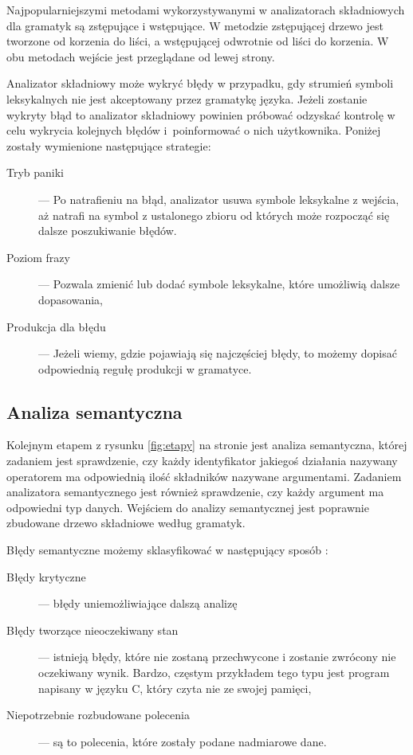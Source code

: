 Najpopularniejszymi metodami wykorzystywanymi w analizatorach składniowych
 dla gramatyk są zstępujące i wstępujące.
W metodzie zstępującej drzewo jest tworzone od korzenia do liści,
 a wstępującej odwrotnie od liści do korzenia.
W obu metodach wejście jest przeglądane od lewej strony.

Analizator składniowy może wykryć błędy w przypadku,
 gdy strumień symboli leksykalnych nie jest akceptowany przez gramatykę języka.
Jeżeli zostanie wykryty błąd to analizator składniowy powinien próbować odzyskać kontrolę w celu wykrycia kolejnych błędów
 i~poinformować o nich użytkownika.
Poniżej zostały  wymienione następujące strategie\cite{aho}:
\begin{description}
  \item[Tryb paniki] --- 
     Po natrafieniu na błąd,
      analizator usuwa symbole leksykalne z wejścia, 
      aż natrafi na symbol z ustalonego zbioru od których może rozpocząć się dalsze poszukiwanie błędów.
  \item[Poziom frazy] --- 
     Pozwala zmienić lub dodać symbole leksykalne,
      które umożliwią dalsze dopasowania,
  \item [Produkcja dla błędu] --- 
     Jeżeli wiemy, 
      gdzie pojawiają się najczęściej błędy,
      to możemy dopisać odpowiednią regułę produkcji w gramatyce.
\end{description}

\subsection{Analiza semantyczna} \label{p_semantyczna}
Kolejnym etapem z rysunku \ref{fig:etapy} na stronie \pageref{fig:etapy} jest analiza semantyczna,
 której zadaniem jest sprawdzenie, 
 czy każdy identyfikator jakiegoś działania nazywany operatorem ma odpowiednią ilość składników nazywane argumentami.
Zadaniem analizatora semantycznego jest również sprawdzenie, czy każdy argument ma odpowiedni typ danych.
Wejściem do analizy semantycznej jest poprawnie zbudowane drzewo składniowe według gramatyk. \cite{aho}

 Błędy semantyczne możemy sklasyfikować w następujący sposób \cite{link_semantic}:
\begin{description}
 \item[Błędy krytyczne] ---
    błędy uniemożliwiające dalszą analizę 
 \item[Błędy tworzące nieoczekiwany stan] --- 
    istnieją błędy, które nie zostaną przechwycone i zostanie zwrócony nie oczekiwany wynik. Bardzo,
    częstym przykładem tego typu jest program napisany w języku C, który czyta nie ze swojej pamięci,
 \item[Niepotrzebnie rozbudowane polecenia] --- są to polecenia, które zostały podane nadmiarowe dane.
\end{description}


\begin{comment} 
\end{comment}